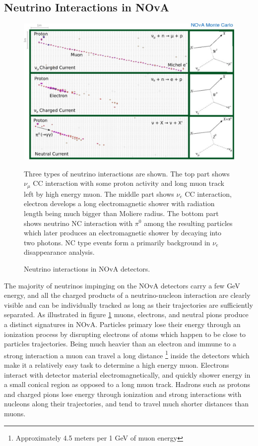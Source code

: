 \subsection{Neutrino Interactions in NOvA}
\begin{figure}
\includegraphics[width=1.0\textwidth]{figures/Det_topologies.pdf}\\%
\caption{Neutrino interactions in NOvA detectors.}
{Three types of neutrino interactions are shown. The top part shows $\nu_\mu$ CC interaction with some
proton activity and long muon track left by high energy muon. The middle part shows $\nu_e$ CC interaction,
electron develops a long electromagnetic shower with radiation length being much bigger than Moliere radius.
The bottom part shows neutrino NC interaction with $\pi^0$ among the resulting particles which later produces
an electromagnetic shower by decaying into two photons. NC type events form a primarily background in $\nu_e$
disappearance analysis.} \label{fig:Topologies}
\end{figure}
The majority of neutrinos impinging on the NOvA detectors carry a few GeV energy, and all the charged
products of a neutrino-nucleon interaction are clearly visible and can be individually tracked as long as their 
trajectories are sufficiently separated. As illustrated in figure \ref{fig:Topologies} muons, electrons, 
and neutral pions produce a distinct signatures in NOvA. Particles primary lose their energy through an 
ionization 
process by disrupting electrons of atoms which happen to be close to particles trajectories. Being 
much heavier than an electron and immune to a strong interaction a muon can travel a long distance
\footnote{Approximately 4.5 meters per 1 GeV of muon energy} inside the detectors which make it a relatively 
easy task to determine a high energy muon. Electrons interact with detector material electromagnetically, and 
quickly shower energy in a small conical region as opposed to a long muon track. Hadrons such as protons and 
charged pions lose energy through ionization and strong interactions with nucleons along their trajectories, and tend 
to travel much shorter distances than muons.

